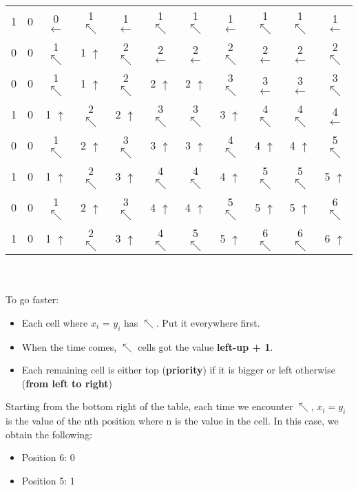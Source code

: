 \documentclass[11pt]{article}
\begin{document}
\begin{enumerate}
\begin{tabular}{ c | c c c c c c c c c c }
        1 & 0 & 0 $\leftarrow$ & 1 $\nwarrow$ & 1 $\leftarrow$ & 1 $\nwarrow$ & 1 $\nwarrow$ & 1 $\leftarrow$ & 1 $\nwarrow$ & 1 $\nwarrow$ & 1 $\leftarrow$ \\
        0 & 0 & 1 $\nwarrow$ & 1 $\uparrow$ & 2 $\nwarrow$ & 2 $\leftarrow$ & 2 $\leftarrow$ & 2 $\nwarrow$ & 2 $\leftarrow$ & 2 $\leftarrow$ & 2 $\nwarrow$ \\
        0 & 0 & 1 $\nwarrow$ & 1 $\uparrow$ & 2 $\nwarrow$ & 2 $\uparrow$ & 2 $\uparrow$ & 3 $\nwarrow$ & 3 $\leftarrow$ & 3 $\leftarrow$ & 3 $\nwarrow$ \\
        1 & 0 & 1 $\uparrow$ & 2 $\nwarrow$ & 2 $\uparrow$ & 3 $\nwarrow$ & 3 $\nwarrow$ & 3 $\uparrow$ & 4 $\nwarrow$ & 4 $\nwarrow$ & 4 $\leftarrow$ \\
        0 & 0 & 1 $\nwarrow$ & 2 $\uparrow$ & 3 $\nwarrow$ & 3 $\uparrow$ & 3 $\uparrow$ & 4 $\nwarrow$ & 4 $\uparrow$ & 4 $\uparrow$ & 5 $\nwarrow$ \\
        1 & 0 & 1 $\uparrow$ & 2 $\nwarrow$ & 3 $\uparrow$ & 4 $\nwarrow$ & 4 $\nwarrow$ & 4 $\uparrow$ & 5 $\nwarrow$ & 5 $\nwarrow$ & 5 $\uparrow$ \\
        0 & 0 & 1 $\nwarrow$ & 2 $\uparrow$ & 3 $\nwarrow$ & 4 $\uparrow$ & 4 $\uparrow$ & 5 $\nwarrow$ & 5 $\uparrow$ & 5 $\uparrow$ & 6 $\nwarrow$ \\
        1 & 0 & 1 $\uparrow$ & 2 $\nwarrow$ & 3 $\uparrow$ & 4 $\nwarrow$ & 5 $\nwarrow$ & 5 $\uparrow$ & 6 $\nwarrow$ & 6 $\nwarrow$ & 6 $\uparrow$ \\
    \end{tabular}
    \\\\ To go faster:    
    \begin{itemize}
        \item Each cell where $x_i$ = $y_i$ has $\nwarrow$. Put it everywhere first.
        \item When the time comes, $\nwarrow$ cells got the value \textbf{left-up + 1}.
        \item Each remaining cell is either top (\textbf{priority}) if it is bigger or left otherwise (\textbf{from left to right})
    \end{itemize}
    Starting from the bottom right of the table, each time we encounter $\nwarrow$, $x_i = y_i$ is the value of the nth position where n is the value in the cell. In this case, we obtain the following:
    \begin{itemize}
        \item Position 6: 0
        \item Position 5: 1

\end{itemize}
\end{enumerate}
\end{document}

